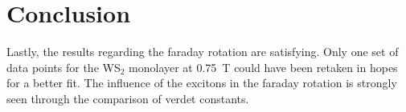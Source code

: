 \newpage
\section{Conclusion}


  Lastly, the results regarding the faraday rotation are satisfying. Only one set of data points for the WS$_2$ monolayer at \SI{0.75}{\tesla} could have been retaken in hopes for a better fit.
  The influence of the excitons in the faraday rotation is strongly seen through the comparison of verdet constants.
